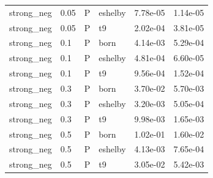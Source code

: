 \begin{tabular}{llllll}
strong\_neg & 0.05 & P & eshelby & 7.78e-05 & 1.14e-05 \\
strong\_neg & 0.05 & P & t9 & 2.02e-04 & 3.81e-05 \\
strong\_neg & 0.1 & P & born & 4.14e-03 & 5.29e-04 \\
strong\_neg & 0.1 & P & eshelby & 4.81e-04 & 6.60e-05 \\
strong\_neg & 0.1 & P & t9 & 9.56e-04 & 1.52e-04 \\
strong\_neg & 0.3 & P & born & 3.70e-02 & 5.70e-03 \\
strong\_neg & 0.3 & P & eshelby & 3.20e-03 & 5.05e-04 \\
strong\_neg & 0.3 & P & t9 & 9.98e-03 & 1.65e-03 \\
strong\_neg & 0.5 & P & born & 1.02e-01 & 1.60e-02 \\
strong\_neg & 0.5 & P & eshelby & 4.13e-03 & 7.65e-04 \\
strong\_neg & 0.5 & P & t9 & 3.05e-02 & 5.42e-03 \\
\bottomrule
\end{tabular}
